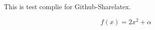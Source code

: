 \documentclass{article}
\begin{document}
This is test complie for Github-Sharelatex. 

\[ f(x) = 2 x^2 + \alpha \] 
\end{document}
